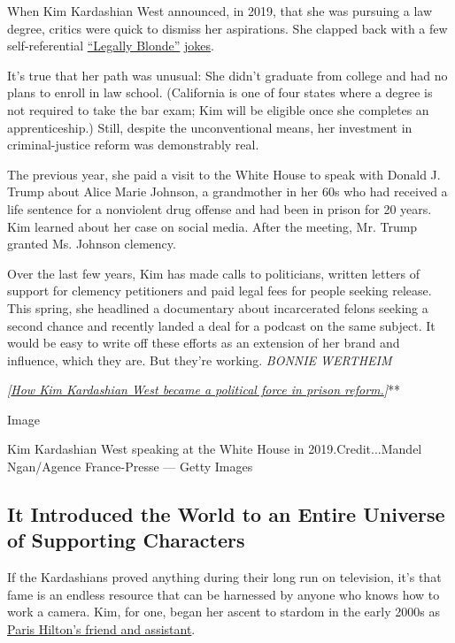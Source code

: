 When Kim Kardashian West announced, in 2019, that she was pursuing a law
degree, critics were quick to dismiss her aspirations. She clapped back
with a few self-referential
\href{https://www.instagram.com/p/B4SlVlyg_0G/?utm_source=ig_embed}{``Legally
Blonde''}
\href{https://twitter.com/KimKardashian/status/1189956773374939136}{jokes}.

It's true that her path was unusual: She didn't graduate from college
and had no plans to enroll in law school. (California is one of four
states where a degree is not required to take the bar exam; Kim will be
eligible once she completes an apprenticeship.) Still, despite the
unconventional means, her investment in criminal-justice reform was
demonstrably real.

The previous year, she paid a visit to the White House to speak with
Donald J. Trump about Alice Marie Johnson, a grandmother in her 60s who
had received a life sentence for a nonviolent drug offense and had been
in prison for 20 years. Kim learned about her case on social media.
After the meeting, Mr. Trump granted Ms. Johnson clemency.

Over the last few years, Kim has made calls to politicians, written
letters of support for clemency petitioners and paid legal fees for
people seeking release. This spring, she headlined a documentary about
incarcerated felons seeking a second chance and recently landed a deal
for a podcast on the same subject. It would be easy to write off these
efforts as an extension of her brand and influence, which they are. But
they're working. \emph{BONNIE WERTHEIM}

\emph{\emph{\emph{{[}}\href{https://www.nytimes3xbfgragh.onion/2020/04/02/arts/television/kim-kardashian-prison-reform.html}{\emph{How
Kim Kardashian West became a political force in prison reform.}}}{]}}**

Image

Kim Kardashian West speaking at the White House in 2019.Credit...Mandel
Ngan/Agence France-Presse --- Getty Images

\hypertarget{it-introduced-the-world-to-an-entire-universe-of-supporting-characters}{%
\subsection{It Introduced the World to an Entire Universe of Supporting
Characters}\label{it-introduced-the-world-to-an-entire-universe-of-supporting-characters}}

If the Kardashians proved anything during their long run on television,
it's that fame is an endless resource that can be harnessed by anyone
who knows how to work a camera. Kim, for one, began her ascent to
stardom in the early 2000s as
\href{https://www.bustle.com/p/this-kim-kardashian-paris-hilton-timeline-captures-the-ups-downs-of-their-friendship-8271056}{Paris
Hilton's friend and assistant}.


